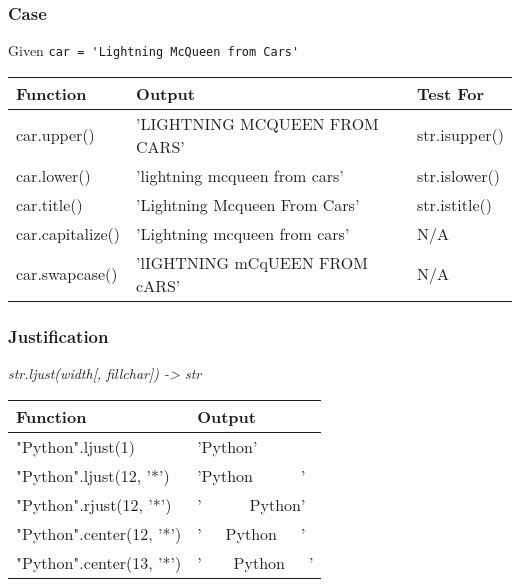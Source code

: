\documentclass{beamer}
\begin{document}
%
%
\begin{frame}
  \frametitle{Case}
  Given \lstinline{car = 'Lightning McQueen from Cars'}
  \begin{table}
    \begin{tabular}{l | l | l}
    Function & Output & Test For \\
    \hline
    car.upper() & 'LIGHTNING MCQUEEN FROM CARS' & str.isupper() \\
    car.lower() & 'lightning mcqueen from cars' & str.islower() \\
    car.title() & 'Lightning Mcqueen From Cars' & str.istitle() \\
    car.capitalize() & 'Lightning mcqueen from cars' & N/A \\
    car.swapcase() & 'lIGHTNING mCqUEEN FROM cARS' & N/A
    \end{tabular}
  \end{table}
\end{frame}


%
%
\begin{frame}
  \frametitle{Justification}
  \textit{str.ljust(width[, fillchar]) -> str}
  \begin{table}
    \begin{tabular}{l | l}
    Function & Output \\
    \hline
    "Python".ljust(1) & 'Python' \\
    "Python".ljust(12, '*') & 'Python~~~~~~' \\
    "Python".rjust(12, '*') & '~~~~~~Python' \\
    "Python".center(12, '*') & '~~~Python~~~' \\
    "Python".center(13, '*') & '~~~~Python~~~' \\
    \end{tabular}
  \end{table}
\end{frame}
\end{document}
